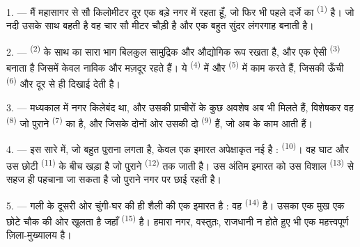 
\VUsaut{2.0mm}
\VUsaut{3.0mm}
\VUfilet{16mm}
\VUsaut{5.6mm}
\VUsaut{1.4mm}
\VUsaut{2.2mm}

\VUsaut{3.0mm}

1. --- मैं महासागर से सौ किलोमीटर दूर एक बड़े नगर में रहता हूँ, जो फिर भी
पहले दर्जे का  \textsuperscript{(1)} है। जो नदी उसके साथ बहती है
वह चार सौ मीटर चौड़ी है और एक बहुत सुंदर लंगरगाह बनाती है।

2. ---  \textsuperscript{(2)} के साथ का सारा भाग बिलकुल सामुद्रिक और
औद्योगिक रूप रखता है, और एक ऐसी  \textsuperscript{(3)} बनाता
है जिसमें केवल नाविक और मज़दूर रहते हैं। ये 
\textsuperscript{(4)} में और  \textsuperscript{(5)} में काम करते हैं,
जिसकी ऊँची  \textsuperscript{(6)} और  दूर से ही
दिखाई देती है।

3. --- मध्यकाल में नगर किलेबंद था, और उसकी प्राचीरों के कुछ अवशेष अब भी मिलते
हैं, विशेषकर वह  \textsuperscript{(8)} जो पुराने
 \textsuperscript{(7)} का है, और जिसके दोनों ओर उसकी दो  \textsuperscript{(9)}
हैं, जो अब  के काम आती हैं।

4. --- इस सारे  में, जो बहुत पुराना लगता है, केवल एक इमारत
अपेक्षाकृत नई है :  \textsuperscript{(10)}। वह घाट और उस छोटी
 \textsuperscript{(11)} के बीच खड़ा है जो पुराने 
\textsuperscript{(12)} तक जाती है। उस अंतिम इमारत को उस विशाल 
\textsuperscript{(13)} से सहज ही पहचाना जा सकता है जो पुराने नगर पर छाई रहती है।

5. --- गली के दूसरी ओर चुंगी-घर की ही शैली की एक इमारत  है : वह
 \textsuperscript{(14)} है। उसका एक मुख एक छोटे चौक की ओर
खुलता है जहाँ  \textsuperscript{(15)} है। हमारा नगर, वस्तुतः,
राजधानी न होते हुए भी एक महत्त्वपूर्ण ज़िला-मुख्यालय है।

